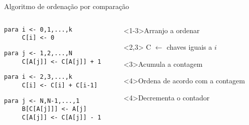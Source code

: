 \begin{frame}[fragile]{Algoritmo de ordenação por comparação}

\footnotesize
\begin{columns}
\begin{column}{.5\textwidth}

{
\begin{lstlisting}
para i <- 0,1,...,k
     C[i] <- 0
\end{lstlisting}
}

{
\begin{lstlisting}
para j <- 1,2,...,N
     C[A[j]] <- C[A[j]] + 1
\end{lstlisting}
}

{
\begin{lstlisting}
para i <- 2,3,...,k
     C[i] <- C[i] + C[i-1]
\end{lstlisting}
}

{
\begin{lstlisting}
para j <- N,N-1,...,1
     B[C[A[j]]] <- A[j]
     C[A[j]] <- C[A[j]] - 1
\end{lstlisting}
}

\end{column}

\begin{column}{.5\textwidth}

\begin{block}<1-3>{Arranjo a ordenar}
\end{block}


\begin{block}<2,3>{ C $\leftarrow$ chaves iguais a $i$}
{
}
\end{block}

\begin{block}<3>{Acumula a contagem}
\end{block}

\vspace{-4cm}
\begin{block}<4>{Ordena de acordo com a contagem}
\end{block}
\begin{block}<4>{Decrementa o contador}
\end{block}


\end{column}
\end{columns}
\end{frame}
